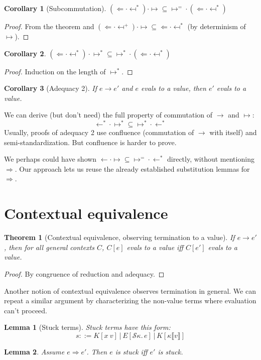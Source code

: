 \documentclass[a4paper, 11pt,titlepage, openright, twoside]{report}
\newcommand{\Int}{\Rightarrow}
\newcommand{\Tni}{\Leftarrow}
\renewcommand{\S}{\mathcal{S}}
\newcommand{\+}{\enspace}
\newtheorem{corollary}{Corollary}
\newtheorem{lemma}{Lemma}
\newtheorem{theorem}{Theorem}
\begin{document}
\begin{corollary}[Subcommutation]
	${(\Tni · \mapsfrom^*) · ↦} ⊆ {↦^= \mathbin{·} ({{\Tni} · \mapsfrom^*})}$
\end{corollary}
\begin{proof}
	From the theorem %
	and
	${(\Tni · \mapsfrom^+) · ↦} ⊆ {{{\Tni} · \mapsfrom^*}}$ (by determinism of $↦$).
\end{proof}
\begin{corollary}
	${(\Tni · \mapsfrom^*) · ↦^*} ⊆ {↦^* \mathbin{·} ({{\Tni} · \mapsfrom^*})}$
\end{corollary}
\begin{proof}
	Induction on the length of $↦^*$.
\end{proof}
\begin{corollary}[Adequacy 2]
	If $e → e'$ and $e$ evals to a value, then $e'$ evals to a value.
\end{corollary}

We can derive (but don't need) the full property of commutation of $→$ and $↦$:
$${←^* · ↦^*} ⊆ {↦^* · ←^*}$$
Usually, proofs of adequacy 2 use confluence (commutation of $→$ with itself) and semi-standardization.
But confluence is harder to prove.

We perhaps could have shown ${← · ↦} ⊆ {↦^= · ←^*}$ directly, without mentioning $\Int$.
Our approach lets us reuse the already established substitution lemmas for $\Int$.

\section{Contextual equivalence}

\begin{theorem}[Contextual equivalence, observing termination to a value]
	\label{ctxeqv1}
	If $e → e'$, then for all general contexts $C$, $C[e]$ evals to a value iff $C[e']$ evals to a value.%
\end{theorem}
\begin{proof}
	By congruence of reduction and adequacy.
\end{proof}

Another notion of contextual equivalence observes termination in general.
We can repeat a similar argument by characterizing the non-value terms
where evaluation can't proceed.

\begin{lemma}[Stuck terms]
	Stuck terms have this form:
	$$s ::= K[x\:v] │ E[\S κ.\,e] │ K[κ⟦v⟧]$$
\end{lemma}
\begin{lemma} Assume $e \Int e'$. Then $e$ is stuck iff $e'$ is stuck.
\end{lemma}
\end{document}
